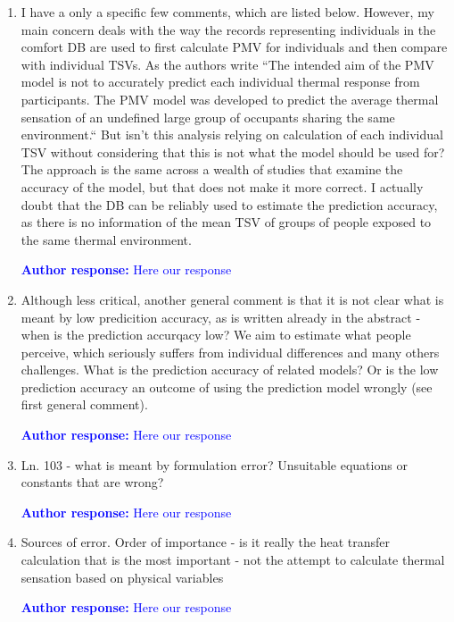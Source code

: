 \documentclass[a4paper, 10pt]{letter}
\newcommand{\response}[1]{\textcolor{blue}{\textbf{Author response:} #1}}
\begin{document}
\begin{letter}
        \begin{enumerate}
            \item I have a only a specific few comments, which are listed below.
            However, my main concern deals with the way the records representing individuals in the comfort DB are used to first calculate PMV for individuals and then compare with individual TSVs.
            As the authors write ``The intended aim of the PMV model is not to accurately predict each individual thermal response from participants.
            The PMV model was developed to predict the average thermal sensation of an undefined large group of occupants sharing the same environment.`` But isn't this analysis relying on calculation of each individual TSV without considering that this is not what the model should be used for?
            The approach is the same across a wealth of studies that examine the accuracy of the model, but that does not make it more correct.
            I actually doubt that the DB can be reliably used to estimate the prediction accuracy, as there is no information of the mean TSV of groups of people exposed to the same thermal environment.

            \response{Here our response}

            \item Although less critical, another general comment is that it is not clear what is meant by low predicition accuracy, as is written already in the abstract - when is the prediction accurqacy low?
            We aim to estimate what people perceive, which seriously suffers from individual differences and many others challenges.
            What is the prediction accuracy of related models?
            Or is the low prediction accuracy an outcome of using the prediction model wrongly (see first general comment).

            \response{Here our response}

            \item Ln. 103 - what is meant by formulation error?
            Unsuitable equations or constants that are wrong?

            \response{Here our response}

            \item Sources of error.
            Order of importance - is it really the heat transfer calculation that is the most important - not the attempt to calculate thermal sensation based on physical variables

            \response{Here our response}


\end{enumerate}
\end{letter}
\end{document}
